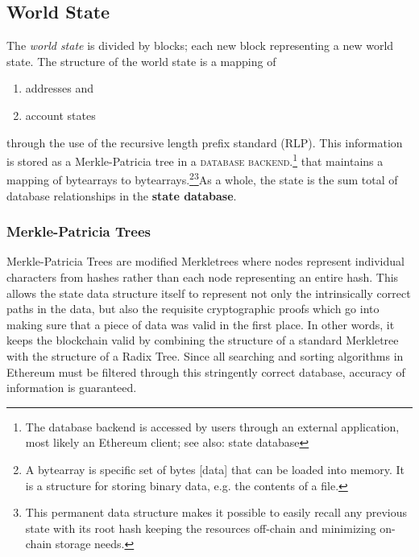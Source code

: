 \documentclass[10pt,letterpaper,leqno,bibliography=totoc]{scrartcl}
\newenvironment{alphafootnotes}
{\par\edef\savedfootnotenumber{\number\value{footnote}}
\renewcommand{\thefootnote}{\alph{footnote}}
\setcounter{footnote}{0}}
{\par\setcounter{footnote}{\savedfootnotenumber}}
\begin{document}
\begin{alphafootnotes}
\begin{multicols*}{2}
			\subsection{World State}
				The \textit{world state} is divided by blocks; each new block representing a new world state. The structure of the world state is a mapping of 
				\begin{enumerate}
					\item addresses and 
					\item account states
				\end{enumerate}
				through the use of the recursive length prefix standard (RLP). This information is stored as a  Merkle-Patricia tree in a \textsc{database backend}.\footnote{The database backend is accessed by users through an external application, most likely an Ethereum client; see also: \gls{state database}} that maintains a mapping of bytearrays to bytearrays.\footnote{A bytearray is specific set of bytes [data] that can be loaded into memory. It is a structure for storing binary data, e.g. the contents of a file.}\footnote{This permanent data structure makes it possible to easily recall any previous state with its root hash keeping the resources off-chain and minimizing on-chain storage needs.}As a whole, the state is the sum total of database relationships in the \textbf{ \gls{state database}}. 
			
			\subsubsection{Merkle-Patricia Trees} 
	
				
	Merkle-Patricia Trees are modified Merkletrees where nodes represent individual characters from hashes rather than each node representing an entire hash. This allows the state data structure itself to represent not only the intrinsically correct paths in the data, but also the requisite cryptographic proofs which go into making sure that a piece of data was valid in the first place. In other words, it keeps the blockchain valid by combining the structure of a standard Merkletree with the structure of a Radix Tree. Since all searching and sorting algorithms in Ethereum must be filtered through this stringently correct database, accuracy of information is guaranteed. \par		
		

\end{multicols*}
\end{alphafootnotes}
\end{document}
